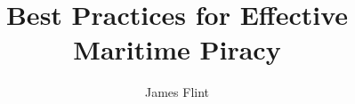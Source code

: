 \documentclass[12pt,phd,a4paper,oneside,draft]{ucl_thesis}
\begin{document}

\title{Best Practices for Effective Maritime Piracy}

\author{James Flint}


\maketitle

\makedeclaration







\tableofcontents
\listoffigures
\listoftables













\newpage


\end{document}
